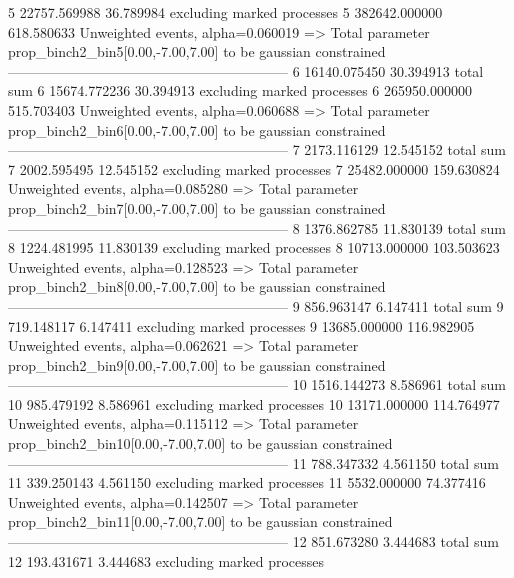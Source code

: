 5          22757.569988    36.789984       excluding marked processes    
5          382642.000000   618.580633      Unweighted events, alpha=0.060019
  => Total parameter prop_binch2_bin5[0.00,-7.00,7.00] to be gaussian constrained
------------------------------------------------------------
6          16140.075450    30.394913       total sum                     
6          15674.772236    30.394913       excluding marked processes    
6          265950.000000   515.703403      Unweighted events, alpha=0.060688
  => Total parameter prop_binch2_bin6[0.00,-7.00,7.00] to be gaussian constrained
------------------------------------------------------------
7          2173.116129     12.545152       total sum                     
7          2002.595495     12.545152       excluding marked processes    
7          25482.000000    159.630824      Unweighted events, alpha=0.085280
  => Total parameter prop_binch2_bin7[0.00,-7.00,7.00] to be gaussian constrained
------------------------------------------------------------
8          1376.862785     11.830139       total sum                     
8          1224.481995     11.830139       excluding marked processes    
8          10713.000000    103.503623      Unweighted events, alpha=0.128523
  => Total parameter prop_binch2_bin8[0.00,-7.00,7.00] to be gaussian constrained
------------------------------------------------------------
9          856.963147      6.147411        total sum                     
9          719.148117      6.147411        excluding marked processes    
9          13685.000000    116.982905      Unweighted events, alpha=0.062621
  => Total parameter prop_binch2_bin9[0.00,-7.00,7.00] to be gaussian constrained
------------------------------------------------------------
10         1516.144273     8.586961        total sum                     
10         985.479192      8.586961        excluding marked processes    
10         13171.000000    114.764977      Unweighted events, alpha=0.115112
  => Total parameter prop_binch2_bin10[0.00,-7.00,7.00] to be gaussian constrained
------------------------------------------------------------
11         788.347332      4.561150        total sum                     
11         339.250143      4.561150        excluding marked processes    
11         5532.000000     74.377416       Unweighted events, alpha=0.142507
  => Total parameter prop_binch2_bin11[0.00,-7.00,7.00] to be gaussian constrained
------------------------------------------------------------
12         851.673280      3.444683        total sum                     
12         193.431671      3.444683        excluding marked processes    
